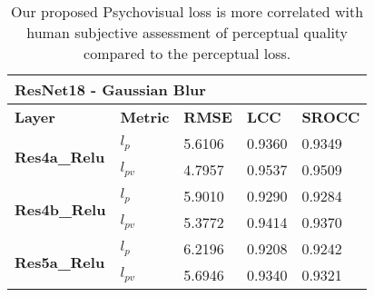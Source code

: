 \documentclass[10pt,twocolumn,letterpaper]{article}
\begin{document}
\begin{table}[]
\caption{Our proposed Psychovisual loss is more correlated with human subjective assessment of perceptual quality compared to the perceptual loss.}
\begin{tabular}{|l|l|l|l|l|}
\hline
\multicolumn{5}{|l|}{\textbf{ResNet18 - Gaussian Blur}}                                                 \\ \hline
\textbf{Layer}                        & \textbf{Metric} & \textbf{RMSE} & \textbf{LCC} & \textbf{SROCC} \\ \hline
\multirow{2}{*}{\textbf{Res4a\_Relu}} & \textbf{$l_{p}$}              & 5.6106        & 0.9360       & 0.9349         \\ \cline{2-5} 
                                      & \textbf{$l_{pv}$}             & 4.7957        & 0.9537       & 0.9509         \\ \hline
\multirow{2}{*}{\textbf{Res4b\_Relu}} & \textbf{$l_{p}$}              & 5.9010        & 0.9290       & 0.9284         \\ \cline{2-5} 
                                      & \textbf{$l_{pv}$}             & 5.3772        & 0.9414       & 0.9370         \\ \hline
\multirow{2}{*}{\textbf{Res5a\_Relu}} & \textbf{$l_{p}$}              & 6.2196        & 0.9208       & 0.9242         \\ \cline{2-5} 
                                      & \textbf{$l_{pv}$}            & 5.6946        & 0.9340       & 0.9321         \\ \hline
\end{tabular}
\end{table}
\end{document}
